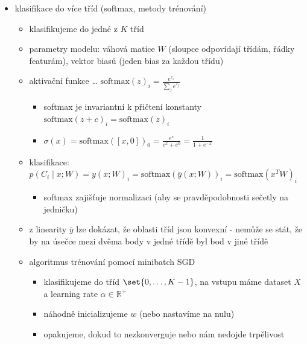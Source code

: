 \begin{itemize}
\begin{itemize}
\begin{itemize}
\begin{itemize}
\begin{itemize}
\item jako $E$ se používá NLL (s $L^2$ regularizací)
\item výsledek se překvapivě podobá lineární regresi
\begin{itemize}
\item gradient je také $(y(x)-t)x$
\end{itemize}
\end{itemize}
\end{itemize}
\end{itemize}
\end{itemize}
\item klasifikace do více tříd (softmax, metody trénování)
\begin{itemize}
\item klasifikujeme do jedné z $K$ tříd
\item parametry modelu: váhová matice $W$ (sloupce odpovídají třídám, řádky featurám), vektor biasů (jeden bias za každou třídu)
\item aktivační funkce \dots{} $\text{softmax}(z)_i=\frac{e^{z_i}}{\sum_je^{z_j}}$
\begin{itemize}
\item softmax je invariantní k přičtení konstanty $\text{softmax}(z+c)_i=\text{softmax}(z)_i$
\item $\sigma(x)=\text{softmax}([x,0])_0=\frac{e^x}{e^x+e^0}=\frac1{1+e^{-x}}$
\end{itemize}
\item klasifikace: $p(C_i\mid x;W)=y(x;W)_i=\text{softmax}(\bar y(x;W))_i=\text{softmax}(x^TW)_i$
\begin{itemize}
\item softmax zajišťuje normalizaci (aby se pravděpodobnosti sečetly na jedničku)
\end{itemize}
\item z linearity $\bar y$ lze dokázat, že oblasti tříd jsou konvexní - nemůže se stát, že by na úsečce mezi dvěma body v jedné třídě byl bod v jiné třídě
\item algoritmus trénování pomocí minibatch SGD
\begin{itemize}
\item klasifikujeme do tříd $\set{0,\dots,K-1}$, na vstupu máme dataset $X$ a learning rate $\alpha\in\mathbb R^+$
\item náhodně inicializujeme $w$ (nebo nastavíme na nulu)
\item opakujeme, dokud to nezkonverguje nebo nám nedojde trpělivost
\begin{itemize}

\end{itemize}
\end{itemize}
\end{itemize}
\end{itemize}
